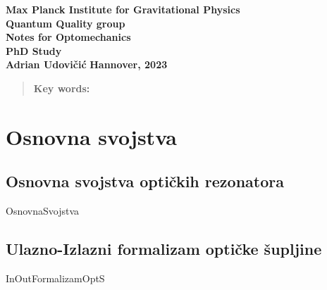 \documentclass[12pt]{article}
\begin{document}
\begin{titlepage}
	\begin{center}
		{\large \textbf{Max Planck Institute for Gravitational Physics}} \\[0.1cm]
		{\large \textbf{Quantum Quality group}}\\[0.1cm]
		{\large \textbf{Notes for Optomechanics}} \\[0.1cm]
		{\LARGE\textbf{PhD Study}}\\[2.5cm]
		\vspace{2cm}
		{\LARGE \textbf{Adrian Udovičić}}
		\vfill
		\large\textbf{{Hannover, 2023} }
	\end{center}
\end{titlepage}


\newpage
{}
\begin{abstract}
	\textbf{Key words:}
\end{abstract}
\newpage
\tableofcontents
\newpage

\section{Osnovna svojstva}
\subsection{Osnovna svojstva optičkih rezonatora}
{OsnovnaSvojstva}
\subsection{Ulazno-Izlazni formalizam optičke šupljine}
{InOutFormalizamOptS}
\end{document}
